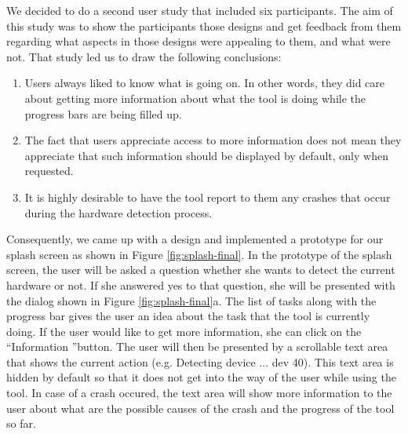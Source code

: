 \documentclass{chi2009}
\begin{document}
We decided to do a second user study that included six participants. The aim of this study was to show the participants those designs and get feedback from
them regarding what aspects in those designs were appealing to them, and what were not. That study led us to draw the following conclusions:
\begin{enumerate}
 \item Users always liked to know what is going on. In other words, they did care about getting more information about what the tool is doing while the progress
bars are being filled up.
 \item The fact that users appreciate access to more information does not mean they appreciate that such information should be displayed by default, only when
requested.
 \item It is highly desirable to have the tool report to them any crashes that occur during the hardware detection process.
\end{enumerate}

Consequently, we came up with a design and implemented a prototype for our splash screen as shown in Figure \ref{fig:splash-final}. In the prototype of the
splash screen, the user will be asked a question whether she wants to detect the current hardware or not. If she answered yes to that question, she will be
presented with the dialog shown in Figure \ref{fig:splash-final}a. The list of tasks along with the progress bar gives the user an idea about the task that the
tool is currently doing. If the user would like to get more information, she can click on the \textquotedblleft Information \textquotedblright button. The user
will then be presented by a scrollable text area that shows the current action (e.g. Detecting device ... dev 40). This text area is hidden by default so that
it does not get into the way of the user while using the tool. In case of a crash occured, the text area will show more information to the user about what are
the possible causes of the crash and the progress of the tool so far.
\end{document}

